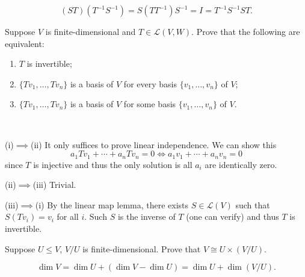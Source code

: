\begin{solution}
\[(ST)(T^{-1}S^{-1})=S(TT^{-1})S^{-1}=I=T^{-1}S^{-1}ST.\]
\end{solution}

\begin{exercise}
Suppose $V$ is finite-dimensional and $T\in\mathcal{L}(V,W)$. Prove that the following are equivalent:
\begin{enumerate}[label=(\roman*)]
\item $T$ is invertible;
\item $\{Tv_1,\dots,Tv_n\}$ is a basis of $V$ for every basis $\{v_1,\dots,v_n\}$ of $V$;
\item $\{Tv_1,\dots,Tv_n\}$ is a basis of $V$ for some basis $\{v_1,\dots,v_n\}$ of $V$.
\end{enumerate}
\end{exercise}

\begin{solution} \

(i)$\implies$(ii) It only suffices to prove linear independence. We can show this
\[a_1Tv_1+\cdots+a_nTv_n=0\iff a_1v_1+\cdots+a_nv_n=0\]
since $T$ is injective and thus the only solution is all $a_i$ are identically zero.

(ii)$\implies$(iii) Trivial.

(iii)$\implies$(i) By the linear map lemma, there exists $S\in\mathcal{L}(V)$ such that $S(Tv_i)=v_i$ for all $i$. Such $S$ is the inverse of $T$ (one can verify) and thus $T$ is invertible.
\end{solution}

\begin{exercise}
Suppose $U\le V$, $V/U$ is finite-dimensional. Prove that $V\cong U\times(V/U)$.
\end{exercise}

\begin{solution}
\[\dim V=\dim U+(\dim V-\dim U)=\dim U+\dim(V/U).\]
\end{solution}